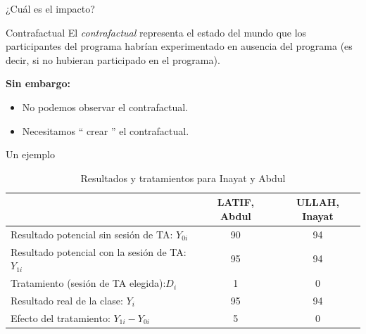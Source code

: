 \documentclass[11pt, aspectratio=169, compress]{beamer}
\begin{document}
\begin{frame}{¿Cuál es el impacto?}
\begin{center}
\end{center}
\end{frame}
\begin{frame}{Contrafactual}
El \textit{contrafactual} representa el estado del mundo que los participantes del programa habrían experimentado en ausencia del programa (es decir, si no hubieran participado en el programa).

\textbf{Sin embargo:}
\begin{itemize}
	\item No podemos observar el contrafactual.
	\item Necesitamos `` crear '' el contrafactual.
\end{itemize}
\end{frame}
\begin{frame}{Un ejemplo}
\begin{table}[H]
\centering 
\begin{threeparttable}
\centering 
\caption{Resultados y tratamientos para Inayat y Abdul}
\small 
\begin{tabular}{l c c} \hline \hline 
													&LATIF, Abdul 	& ULLAH, Inayat \\ \hline
Resultado potencial sin sesión de TA: $ Y_{0i} $	& 90	& 94  	\\
Resultado potencial con la sesión de TA: $ Y_{1i}$ 	& 95	& 94  	\\
Tratamiento (sesión de TA elegida):$ D_i $			& 1		& 0 	\\
Resultado real de la clase: $ Y_{i} $				& 95	& 94   	\\ 
Efecto del tratamiento: $ Y_{1i} - Y_{0i} $			& 5		& 0  	\\ \hline 
\end{tabular}
\end{threeparttable}
\end{table}
\end{frame}
\end{document}
